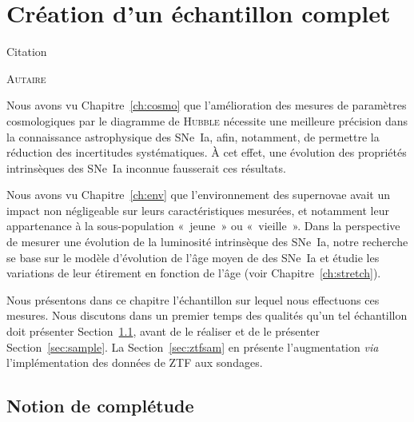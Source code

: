\documentclass[../main/main.tex]{subfiles}
\begin{document}

\chapter{Cr\'eation d'un \'echantillon complet}\label{ch:sample}
\epigraph{\openquote Citation\closequote}{\textsc{Autaire}}

Nous avons vu Chapitre~\ref{ch:cosmo} que l'amélioration des mesures de
paramètres cosmologiques par le diagramme de \textsc{Hubble} nécessite une
meilleure précision dans la connaissance astrophysique des SNe~Ia, afin,
notamment, de permettre la réduction des incertitudes systématiques. À cet
effet, une évolution des propriétés intrinsèques des SNe~Ia inconnue fausserait
ces résultats.

Nous avons vu Chapitre~\ref{ch:env} que l'environnement des supernovae avait un
impact non négligeable sur leurs caractéristiques mesurées, et notamment leur
appartenance à la sous-population «~jeune~» ou «~vieille~». Dans la perspective
de mesurer une évolution de la luminosité intrinsèque des SNe~Ia, notre
recherche se base sur le modèle d'évolution de l'âge moyen de \cite{rigault2020}
des SNe~Ia et étudie les variations de leur étirement en fonction de l'âge (voir
Chapitre~\ref{ch:stretch}).

Nous présentons dans ce chapitre l'échantillon sur lequel nous effectuons ces
mesures. Nous discutons dans un premier temps des qualités qu'un tel échantillon
doit présenter Section~\ref{sec:compl}, avant de le réaliser et de le présenter
Section~\ref{sec:sample}. La Section~\ref{sec:ztfsam} en présente l'augmentation
\textit{via} l'implémentation des données de ZTF aux sondages.

\vfill
\minitoc
\vfill
\newpage

\section{Notion de complétude}\label{sec:compl}

\end{document}
